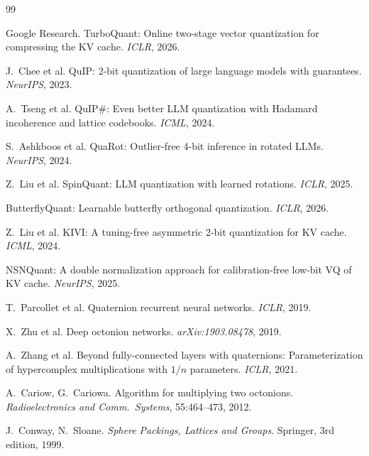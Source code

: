 \documentclass[letterpaper,11pt]{article}
\begin{document}

\begin{thebibliography}{99}

Google Research. TurboQuant: Online two-stage vector quantization for
compressing the KV cache. \emph{ICLR}, 2026.

J.~Chee et al. QuIP: 2-bit quantization of large language models
with guarantees. \emph{NeurIPS}, 2023.

A.~Tseng et al. QuIP\#: Even better LLM quantization with Hadamard
incoherence and lattice codebooks. \emph{ICML}, 2024.

S.~Ashkboos et al. QuaRot: Outlier-free 4-bit inference in rotated LLMs.
\emph{NeurIPS}, 2024.

Z.~Liu et al. SpinQuant: LLM quantization with learned rotations.
\emph{ICLR}, 2025.

ButterflyQuant: Learnable butterfly orthogonal quantization.
\emph{ICLR}, 2026.

Z.~Liu et al. KIVI: A tuning-free asymmetric 2-bit quantization
for KV cache. \emph{ICML}, 2024.

NSNQuant: A double normalization approach for calibration-free low-bit
VQ of KV cache. \emph{NeurIPS}, 2025.

T.~Parcollet et al. Quaternion recurrent neural networks.
\emph{ICLR}, 2019.

X.~Zhu et al. Deep octonion networks. \emph{arXiv:1903.08478}, 2019.

A.~Zhang et al. Beyond fully-connected layers with quaternions:
Parameterization of hypercomplex multiplications with $1/n$ parameters.
\emph{ICLR}, 2021.

A.~Cariow, G.~Cariowa. Algorithm for multiplying two octonions.
\emph{Radioelectronics and Comm.\ Systems}, 55:464--473, 2012.

J.~Conway, N.~Sloane. \emph{Sphere Packings, Lattices and Groups}.
Springer, 3rd edition, 1999.

\end{thebibliography}
\end{document}
